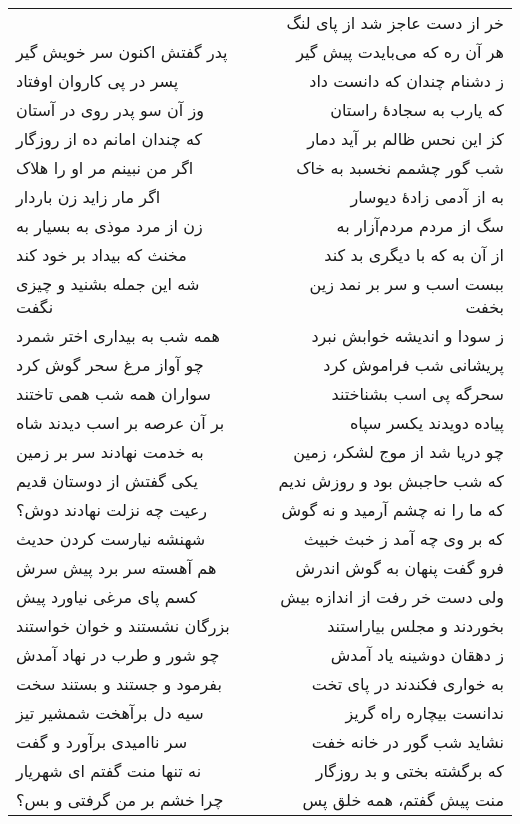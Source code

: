\begin{center}
\begin{longtable}{l p{0.5cm} r}
&&
خر از دست عاجز شد از پای لنگ
\\
پدر گفتش اکنون سر خویش گیر
&&
هر آن ره که می‌بایدت پیش گیر
\\
پسر در پی کاروان اوفتاد
&&
ز دشنام چندان که دانست داد
\\
وز آن سو پدر روی در آستان
&&
که یارب به سجادهٔ راستان
\\
که چندان امانم ده از روزگار
&&
کز این نحس ظالم بر آید دمار
\\
اگر من نبینم مر او را هلاک
&&
شب گور چشمم نخسبد به خاک
\\
اگر مار زاید زن باردار
&&
به از آدمی زادهٔ دیوسار
\\
زن از مرد موذی به بسیار به
&&
سگ از مردم مردم‌آزار به
\\
مخنث که بیداد بر خود کند
&&
از آن به که با دیگری بد کند
\\
شه این جمله بشنید و چیزی نگفت
&&
ببست اسب و سر بر نمد زین بخفت
\\
همه شب به بیداری اختر شمرد
&&
ز سودا و اندیشه خوابش نبرد
\\
چو آواز مرغ سحر گوش کرد
&&
پریشانی شب فراموش کرد
\\
سواران همه شب همی تاختند
&&
سحرگه پی اسب بشناختند
\\
بر آن عرصه بر اسب دیدند شاه
&&
پیاده دویدند یکسر سپاه
\\
به خدمت نهادند سر بر زمین
&&
چو دریا شد از موج لشکر، زمین
\\
یکی گفتش از دوستان قدیم
&&
که شب حاجبش بود و روزش ندیم
\\
رعیت چه نزلت نهادند دوش؟
&&
که ما را نه چشم آرمید و نه گوش
\\
شهنشه نیارست کردن حدیث
&&
که بر وی چه آمد ز خبث خبیث
\\
هم آهسته سر برد پیش سرش
&&
فرو گفت پنهان به گوش اندرش
\\
کسم پای مرغی نیاورد پیش
&&
ولی دست خر رفت از اندازه بیش
\\
بزرگان نشستند و خوان خواستند
&&
بخوردند و مجلس بیاراستند
\\
چو شور و طرب در نهاد آمدش
&&
ز دهقان دوشینه یاد آمدش
\\
بفرمود و جستند و بستند سخت
&&
به خواری فکندند در پای تخت
\\
سیه دل برآهخت شمشیر تیز
&&
ندانست بیچاره راه گریز
\\
سر ناامیدی برآورد و گفت
&&
نشاید شب گور در خانه خفت
\\
نه تنها منت گفتم ای شهریار
&&
که برگشته بختی و بد روزگار
\\
چرا خشم بر من گرفتی و بس؟
&&
منت پیش گفتم، همه خلق پس
\\

\end{longtable}
\end{center}
